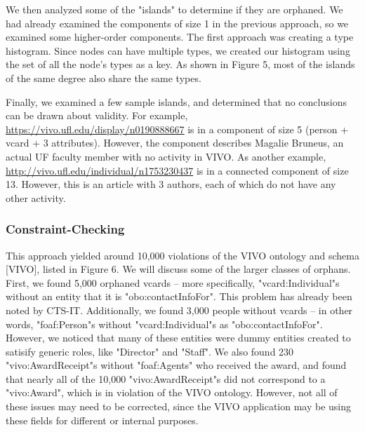 \documentclass[11pt]{article}
\begin{document}
We then analyzed some of the "islands" to determine if they are orphaned. We had already examined the components of size 1 in the previous approach, so we examined some higher-order components. The first approach was creating a type histogram. Since nodes can have multiple types, we created our histogram using the set of all the node's types as a key. As shown in Figure 5, most of the islands of the same degree also share the same types.

Finally, we examined a few sample islands, and determined that no conclusions can be drawn about validity. For example, \url{https://vivo.ufl.edu/display/n0190888667} is in a component of size 5 (person + vcard + 3 attributes). However, the component describes Magalie Bruneus, an actual UF faculty member with no activity in VIVO. As another example, \url{http://vivo.ufl.edu/individual/n1753230437} is in a connected component of size 13. However, this is an article with 3 authors, each of which do not have any other activity.

\subsubsection*{Constraint-Checking}
This approach yielded around 10,000 violations of the VIVO ontology and schema [VIVO], listed in Figure 6. We will discuss some of the larger classes of orphans. First, we found 5,000 orphaned vcards -- more specifically, "vcard:Individual"s without an entity that it is "obo:contactInfoFor". This problem has already been noted by CTS-IT. Additionally, we found 3,000 people without vcards -- in other words, "foaf:Person"s without "vcard:Individual"s as "obo:contactInfoFor". However, we noticed that many of these entities were dummy entities created to satisify generic roles, like "Director" and "Staff". We also found 230 "vivo:AwardReceipt"s without "foaf:Agents" who received the award, and found that nearly all of the 10,000 "vivo:AwardReceipt"s did not correspond to a "vivo:Award", which is in violation of the VIVO ontology. However, not all of these issues may need to be corrected, since the VIVO application may be using these fields for different or internal purposes.
\end{document}
